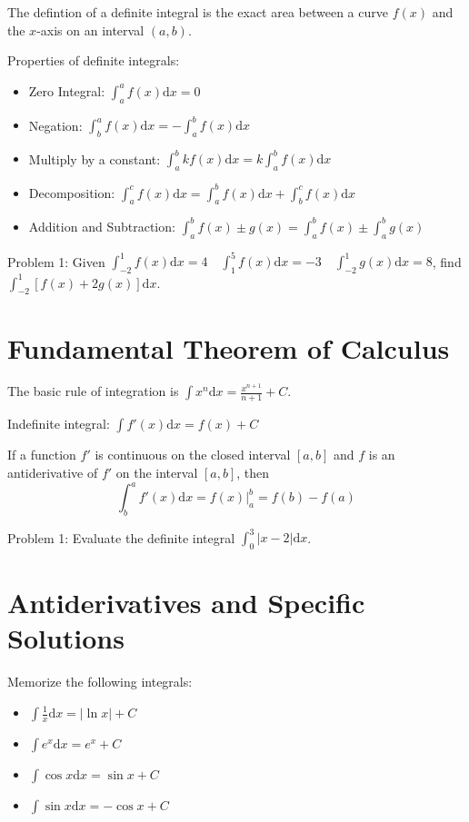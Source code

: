 \documentclass[../abcalc.tex]{subfiles}
\begin{document}
The defintion of a definite integral is the exact area between a curve $f(x)$ and the $x$-axis on an interval $(a,b)$.

Properties of definite integrals:
\begin{itemize}
    \item Zero Integral: $\int_a^a f(x)\mathrm{d}x = 0$
    \item Negation: $\int_b^a f(x)\mathrm{d}x = -\int_a^b f(x)\mathrm{d}x$
    \item Multiply by a constant: $\int_a^b kf(x)\mathrm{d}x = k\int_a^b f(x)\mathrm{d}x$
    \item Decomposition: $\int_a^c f(x)\mathrm{d}x = \int_a^b f(x)\mathrm{d}x + \int_b^c f(x)\mathrm{d}x$
    \item Addition and Subtraction: $\int_a^b f(x)\pm g(x)=\int_a^b f(x)\pm \int_a^b g(x)$
\end{itemize}

Problem 1: Given $\int_{-2}^1 f(x)\mathrm{d}x = 4 \quad \int_1^5 f(x)\mathrm{d}x=-3 \quad \int_{-2}^1 g(x)\mathrm{d}x=8$, find $\int_{-2}^1 [f(x)+2g(x)]\mathrm{d}x$.
\section{Fundamental Theorem of Calculus}
The basic rule of integration is $\int x^n\mathrm{d}x=\frac{x^{n+1}}{n+1}+C$.

Indefinite integral: $\int f'(x)\mathrm{d}x = f(x)+C$

\begin{theorem}
    If a function $f'$ is continuous on the closed interval $[a,b]$ and $f$ is an antiderivative of $f'$ on the interval $[a,b]$, then 
    \[\int^a_b f'(x)\mathrm{d}x = f(x)|^b_a = f(b)-f(a)\]
\end{theorem}

Problem 1: Evaluate the definite integral $\int_0^3 |x-2|\mathrm{d}x$.
\section{Antiderivatives and Specific Solutions}
Memorize the following integrals:
\begin{itemize}
    \item $\int \frac{1}{x}\mathrm{d}x = |\ln x| + C$
    \item $\int e^x \mathrm{d}x = e^x + C$
    \item $\int \cos x \mathrm{d}x = \sin x + C$
    \item $\int \sin x \mathrm{d}x = -\cos x + C$
\end{itemize}
\end{document}
